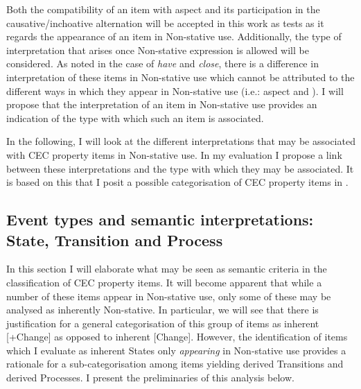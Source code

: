 Both the compatibility of an item with  aspect and its participation in the causative\slash inchoative alternation will be accepted in this work as tests as it regards the appearance of an item in Non-stative use. Additionally, the type of interpretation that arises once Non-stative expression is allowed will be considered. As noted in the case of \textit{have} and \textit{close}, there is a difference in interpretation of these items in Non-stative use which cannot be attributed to the different ways in which they appear in Non-stative use (i.e.:  aspect and ). I will propose that the interpretation of an item in Non-stative use provides an indication of the  type with which such an item is associated. 

In the following, I will look at the different interpretations that may be associated with CEC property items in Non-stative use. In my evaluation I propose a link between these interpretations and the  type with which they may be associated. It is based on this that I posit a possible categorisation of CEC property items in . 


\subsection{Event types and semantic interpretations: State, Transition and Process}\label{sec:5.1.3}\label{sec:5.1.3.1}

In this section I will elaborate what may be seen as semantic criteria in the classification of CEC property items. It will become apparent that while a number of these items appear in Non-stative use, only some of these may be analysed as inherently Non-stative. In particular, we will see that there is justification for a general categorisation of this group of items as inherent  [+Change] as opposed to inherent  [\textminus Change]. However, the identification of items which I evaluate as inherent States only \textit{appearing} in Non-stative use provides a rationale for a sub-categorisation among  items yielding derived Transitions and derived Processes. I present the preliminaries of this analysis below.


